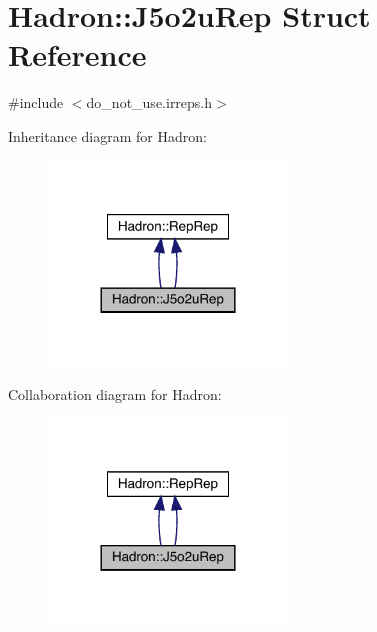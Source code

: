 \hypertarget{structHadron_1_1J5o2uRep}{}\section{Hadron\+:\+:J5o2u\+Rep Struct Reference}
\label{structHadron_1_1J5o2uRep}


{\ttfamily \#include $<$do\+\_\+not\+\_\+use.\+irreps.\+h$>$}



Inheritance diagram for Hadron\+:
\nopagebreak
\begin{figure}[H]
\begin{center}
\leavevmode
\includegraphics[width=180pt]{da/dff/structHadron_1_1J5o2uRep__inherit__graph}
\end{center}
\end{figure}


Collaboration diagram for Hadron\+:
\nopagebreak
\begin{figure}[H]
\begin{center}
\leavevmode
\includegraphics[width=180pt]{dc/d5d/structHadron_1_1J5o2uRep__coll__graph}
\end{center}
\end{figure}
